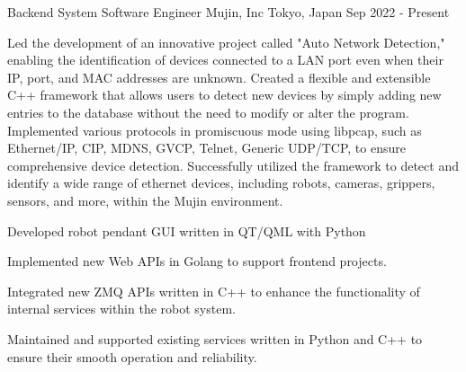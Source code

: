 
\vspace{-2mm}

\begin{cventries}

  \cventry
    {Backend System Software Engineer} %
    {Mujin, Inc} %
    {Tokyo, Japan} %
    {Sep 2022 - Present} %
    {
      \begin{cvitems} %
        \item {
          Led the development of an innovative project called "Auto Network Detection," enabling the identification of devices connected to a LAN port even when their IP, port, and MAC addresses are unknown. Created a flexible and extensible C++ framework that allows users to detect new devices by simply adding new entries to the database without the need to modify or alter the program. Implemented various protocols in promiscuous mode using libpcap, such as Ethernet/IP, CIP, MDNS, GVCP, Telnet, Generic UDP/TCP, to ensure comprehensive device detection. Successfully utilized the framework to detect and identify a wide range of ethernet devices, including robots, cameras, grippers, sensors, and more, within the Mujin environment.
        }
        \item {Developed robot pendant GUI written in QT/QML with Python}
        \item {Implemented new Web APIs in Golang to support frontend projects.}
        \item {Integrated new ZMQ APIs written in C++ to enhance the functionality of internal services within the robot system.}
        \item {Maintained and supported existing services written in Python and C++ to ensure their smooth operation and reliability.}
      \end{cvitems}
    }

    \vspace{-2mm}


\end{cventries}
